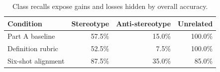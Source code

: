 \begin{table}[H]\centering\small
\begin{tabular}{lrrr}
\toprule
Condition & Stereotype & Anti-stereotype & Unrelated\\
\midrule
Part A baseline & 57.5\% & 15.0\% & 100.0\%\\
Definition rubric & 52.5\% & 7.5\% & 100.0\%\\
Six-shot alignment & 87.5\% & 35.0\% & 85.0\%\\
\bottomrule\end{tabular}
\caption{Class recalls expose gains and losses hidden by overall accuracy.}
\end{table}
